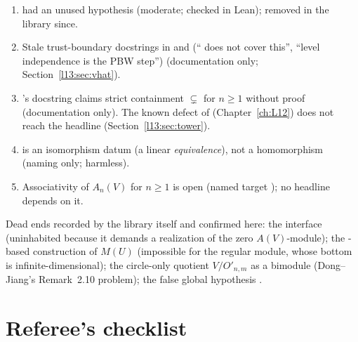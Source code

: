 \begin{enumerate}
   and the three  theorems are vacuous (serious; found by an external
  reviewer; Warning~\ref{l13:warn:carrierbridge}).
\item {} had an unused hypothesis  (moderate; checked in Lean); removed in the library since.
\item Stale trust-boundary docstrings in  and  (``
  does not cover this'', ``level independence is the PBW step'') (documentation only; Section~\ref{l13:sec:vhat}).
\item {}'s docstring claims strict containment  $\subsetneq$  for $n\ge1$ without proof (documentation only).
  The known defect of  (Chapter~\ref{ch:L12}) does not reach the headline (Section~\ref{l13:sec:tower}).
\item {} is an isomorphism datum (a linear \emph{equivalence}), not a homomorphism (naming only; harmless).
\item Associativity of $A_n(V)$ for $n\ge1$ is open (named target ); no headline depends on it.
\end{enumerate}
Dead ends recorded by the library itself and confirmed here: the  interface (uninhabited because it demands a
realization of the zero $A(V)$-module); the -based construction of $M(U)$ (impossible for the regular module, whose
bottom is infinite-dimensional); the circle-only quotient $V/O'_{n,m}$ as a bimodule (Dong--Jiang's Remark~2.10 problem); the false
global hypothesis .

\section{Referee's checklist}\label{l13:sec:checklist}

